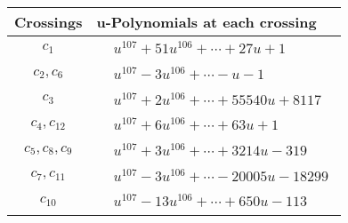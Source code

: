 \documentclass[1p]{elsarticle_modified}
\theoremstyle{definition}
\begin{document}
\begin{tabular}{m{50pt}|m{274pt}}
Crossings & \hspace{64pt}u-Polynomials at each crossing \\
\hline $$\begin{aligned}c_{1}\end{aligned}$$&$\begin{aligned}
&u^{107}+51 u^{106}+\cdots+27 u+1
\end{aligned}$\\
\hline $$\begin{aligned}c_{2},c_{6}\end{aligned}$$&$\begin{aligned}
&u^{107}-3 u^{106}+\cdots- u-1
\end{aligned}$\\
\hline $$\begin{aligned}c_{3}\end{aligned}$$&$\begin{aligned}
&u^{107}+2 u^{106}+\cdots+55540 u+8117
\end{aligned}$\\
\hline $$\begin{aligned}c_{4},c_{12}\end{aligned}$$&$\begin{aligned}
&u^{107}+6 u^{106}+\cdots+63 u+1
\end{aligned}$\\
\hline $$\begin{aligned}c_{5},c_{8},c_{9}\end{aligned}$$&$\begin{aligned}
&u^{107}+3 u^{106}+\cdots+3214 u-319
\end{aligned}$\\
\hline $$\begin{aligned}c_{7},c_{11}\end{aligned}$$&$\begin{aligned}
&u^{107}-3 u^{106}+\cdots-20005 u-18299
\end{aligned}$\\
\hline $$\begin{aligned}c_{10}\end{aligned}$$&$\begin{aligned}
&u^{107}-13 u^{106}+\cdots+650 u-113
\end{aligned}$\\
\hline
\end{tabular}\\~\\
\newpage\renewcommand{\arraystretch}{1}
\end{document}
